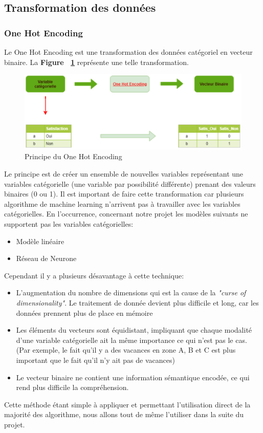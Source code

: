\documentclass{article} %
\begin{document}
\subsection{Transformation des données}
\subsubsection{One Hot Encoding}
Le One Hot Encoding est une transformation des données catégoriel en vecteur binaire. La \textbf{Figure ~\ref{fig:OHE}} représente une telle transformation.
\begin{figure}[!h]
	\centering
	\includegraphics[keepaspectratio = true,scale=0.55]{OHE.png}
	\caption{Principe du One Hot Encoding}
	\label{fig:OHE}
\end{figure}
Le principe est de créer un ensemble de nouvelles variables représentant une variables catégorielle (une variable par possibilité différente) prenant des valeurs binaires (0 ou 1). Il est important de faire cette transformation car plusieurs algorithme de machine learning n'arrivent pas à travailler avec les variables catégorielles. En l'occurrence, concernant notre projet les modèles suivants ne supportent pas les variables catégorielles: \begin{itemize}
	\item Modèle linéaire
	\item Réseau de Neurone
\end{itemize}
Cependant il y a plusieurs désavantage à cette technique:
\begin{itemize}
	\item L'augmentation du nombre de dimensions qui est la cause de la \textit{"curse of dimensionality"}. Le traitement de donnée devient plus difficile et long, car les données prennent plus de place en mémoire
	\item Les éléments du vecteurs sont équidistant, impliquant que chaque modalité d'une variable catégorielle ait la même importance ce qui n'est pas le cas. (Par exemple, le fait qu'il y a des vacances en zone A, B et C est plus important que le fait qu'il n'y ait pas de vacances)
	\item Le vecteur binaire ne contient une information sémantique encodée, ce qui rend plus difficile la compréhension.
\end{itemize}
Cette méthode étant simple à appliquer et permettant l'utilisation direct de la majorité des algorithme, nous allons tout de même l'utiliser dans la suite du projet.
 
\end{document}
